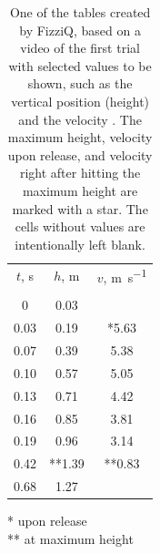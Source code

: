 \begin{table}
  \caption{One of the tables created by FizziQ, based on a video of the first trial with selected values to be shown, such as the vertical position (height) and the velocity \cite{chazot:2025:using}. The maximum height, velocity upon release, and velocity right after hitting the maximum height are marked with a star. The cells without values are intentionally left blank.}
  \label{tab:4}
  \begin{center}
    \begin{ruledtabular}
      \begin{tabular}{SSS}
        {$t$, \unit{\second}} & {$h$, \unit{\meter}} & {$v$, \unit{\meter\per\second}} \\
        \colrule \\
        0 & 0.03 & \\
        0.03 & 0.19 & *5.63 \\
        0.07 & 0.39 & 5.38 \\
        0.10 & 0.57 & 5.05 \\
        0.13 & 0.71 & 4.42 \\
        0.16 & 0.85 & 3.81 \\
        0.19 & 0.96 & 3.14 \\
        0.42 & **1.39 & **0.83 \\
        0.68 & 1.27 & \\
      \end{tabular}
    \end{ruledtabular}
  \end{center}
\flushleft\scriptsize
* upon release \\ 
** at maximum height
\end{table}
